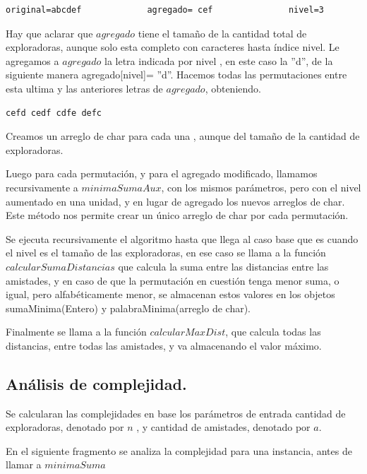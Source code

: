 \begin{verbatim}
original=abcdef	         	agregado= cef		        nivel=3
\end{verbatim}

Hay que aclarar que $ agregado $ tiene el tamaño de la cantidad total de exploradoras, aunque solo esta completo con caracteres hasta índice nivel. Le agregamos a $agregado$ la letra indicada por nivel , en este caso la ''d'', de la siguiente manera agregado[nivel]= ''d''. Hacemos todas las permutaciones entre esta ultima y las anteriores letras de $agregado$, obteniendo.

\begin{verbatim}
cefd cedf cdfe defc
\end{verbatim}

Creamos un arreglo de char para cada una , aunque del tamaño de la cantidad de exploradoras.

Luego para cada permutación, y para el agregado modificado, llamamos recursivamente a $minimaSumaAux$, con los mismos parámetros, pero con el nivel aumentado en una unidad, y en lugar de agregado los nuevos arreglos de char. Este método nos permite crear un único arreglo de char por cada permutación.

Se ejecuta recursivamente el algoritmo hasta que llega al caso base que es cuando el nivel es el tamaño de las exploradoras, en ese caso se llama a la función $ calcularSumaDistancias $ que calcula la suma entre las distancias entre las amistades, y en caso de que la permutación en cuestión tenga menor suma, o igual, pero alfabéticamente menor, se almacenan estos valores en los objetos sumaMinima(Entero) y palabraMinima(arreglo de char).

Finalmente se llama a la función $calcularMaxDist$, que calcula todas las distancias, entre todas las amistades, y va almacenando el valor máximo.

\newpage

\subsection{Análisis de complejidad.}



Se calcularan las complejidades en base los parámetros de entrada cantidad de exploradoras, denotado por $ n $ , y cantidad de amistades, denotado por $ a $.

En el siguiente fragmento se analiza la complejidad para una instancia, antes de llamar a $minimaSuma$

